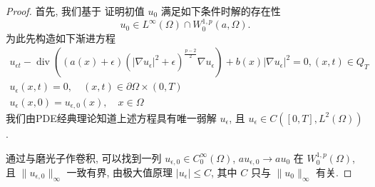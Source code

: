 \documentclass[twoside,longtitle]{LZUthesis}
\theoremstyle{definition}
\numberwithin{equation}{chapter}
\newcommand*\abs[1]{\lvert#1\rvert}
\newcommand*\norm[1]{\lVert#1\rVert}
\DeclareMathOperator{\Div}{div}
\begin{document}
\begin{proof}
	首先, 我们基于 {\cite{Zhan2019Uniquenessa}} 证明初值 $u_0$ 满足如下条件时解的存在性
	\begin{equation}\label{initial_data_condition_tmp}
		u_0 \in L^{\infty}(\Omega) \cap W_0^{1, p}(a, \Omega).
	\end{equation}
	为此先构造如下渐进方程
	\begin{gather}
		u_{\epsilon t}-\Div\left((a(x)+\epsilon)
		\left(\left|\nabla u_{\epsilon}\right|^{2}+\epsilon\right)^{\frac{p-2}{2}} \nabla u_{\epsilon}\right)
		+b(x)\left|\nabla u_{\epsilon}\right|^{2} = 0,(x, t) \in Q_{T} \label{eq:approximated_maineq} \\
		u_{\epsilon}(x, t)  = 0, \quad(x, t) \in \partial \Omega \times(0, T)\\
		u_{\epsilon}(x, 0)  = u_{\epsilon, 0}(x), \quad x \in \Omega
	\end{gather}
	我们由PDE经典理论知道上述方程具有唯一弱解 $u_\epsilon$, 且 $u_\epsilon \in C([0, T], L^2(\Omega))$.

	通过与磨光子作卷积,
	可以找到一列 $u_{\epsilon,0} \in C_0^\infty(\Omega) $, $au_{\epsilon,0} \to au_0 $ 在 $W_0^{1,p}(\Omega) $,
	且 $\norm{u_{\epsilon, 0}}_{\infty}$ 一致有界,
	由极大值原理 $\abs{u_{\epsilon}} \leq C$,
	其中 $C$ 只与 $\norm{u_0}_{\infty} $ 有关.


\end{proof}
\end{document}
